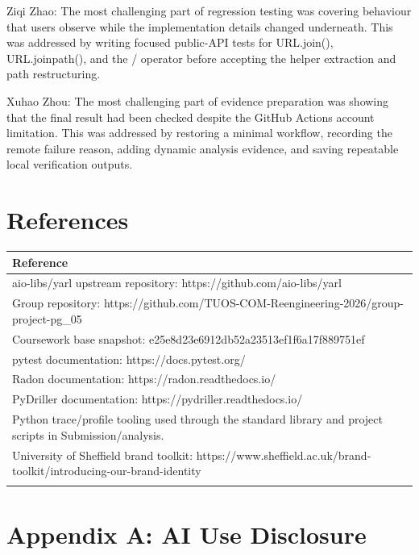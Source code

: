 \documentclass[11pt,a4paper]{article}
\begin{document}
Ziqi Zhao: The most challenging part of regression testing was covering behaviour that users observe while the implementation details changed underneath. This was addressed by writing focused public-API tests for URL.join(), URL.joinpath(), and the / operator before accepting the helper extraction and path restructuring.


Xuhao Zhou: The most challenging part of evidence preparation was showing that the final result had been checked despite the GitHub Actions account limitation. This was addressed by restoring a minimal workflow, recording the remote failure reason, adding dynamic analysis evidence, and saving repeatable local verification outputs.


\section*{References}


\begin{longtable}{p{}}
\toprule
Reference \\
\midrule
aio-libs/yarl upstream repository: https://github.com/aio-libs/yarl \\
\addlinespace
Group repository: https://github.com/TUOS-COM-Reengineering-2026/group-project-pg\_05 \\
\addlinespace
Coursework base snapshot: e25e8d23e6912db52a23513ef1f6a17f889751ef \\
\addlinespace
pytest documentation: https://docs.pytest.org/ \\
\addlinespace
Radon documentation: https://radon.readthedocs.io/ \\
\addlinespace
PyDriller documentation: https://pydriller.readthedocs.io/ \\
\addlinespace
Python trace/profile tooling used through the standard library and project scripts in Submission/analysis. \\
\addlinespace
University of Sheffield brand toolkit: https://www.sheffield.ac.uk/brand-toolkit/introducing-our-brand-identity \\
\addlinespace
\bottomrule
\end{longtable}


\section*{Appendix A: AI Use Disclosure}
\end{document}
